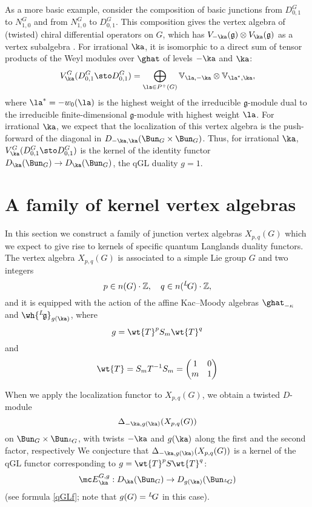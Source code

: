 \documentclass[11pt,reqno]{amsart}
\theoremstyle{plain}
\numberwithin{equation}{section}
\newcommand{\Z}{\mathbb{Z}}
\newcommand{\g}{\mathfrak{g}}
\def\neg{\negthinspace}
\def\lg{{}^L\neg\g}
\def\hlg{\wh{\lg}}
\def\LG{{}^L\neg G}
\theoremstyle{definition}
\begin{document}
As a more basic example, consider the composition of basic junctions
from $D^G_{0,1}$ to $N^G_{1,0}$ and from $N^G_{1,0}$ to
$D^G_{0,1}$. This composition gives the vertex algebra of (twisted)
chiral differential operators on $G$, which has $V_{-\ka}(\g) \otimes
V_{\ka}(\g)$ as a vertex subalgebra \cite{AG1}. For irrational $\ka$, it
is isomorphic to a direct sum of tensor products of the Weyl modules
over $\ghat$ of levels $-\ka$ and $\ka$:
$$
V^G_\ka(D^{G}_{0,1} \sto D^G_{0,1}) =
\bigoplus_{\la \in P^+(G)} {\mathbb V}_{\la,-\ka} \otimes {\mathbb
  V}_{\la^*,\ka},
$$
where $\la^*=-w_0(\la)$ is the highest weight of the irreducible
$\g$-module dual to the irreducible finite-dimensional $\g$-module
with highest weight $\la$. For irrational $\ka$, we expect that the
localization of this vertex algebra is the push-forward of the
diagonal in $D_{-\ka,\ka}(\Bun_G \times \Bun_G)$. Thus, for irrational
$\ka$, $V^G_\ka(D^{G}_{0,1} \sto D^G_{0,1})$ is the kernel of the
identity functor $D_\ka(\Bun_G) \to D_\ka(\Bun_G)$, the qGL duality
$g=1$.

\section{A family of kernel vertex algebras}    \label{fam ker}

In this section we construct a family of junction vertex algebras
$X_{p,q}(G)$ which we expect to give rise to kernels of specific
quantum Langlands duality functors. The vertex algebra $X_{p,q}(G)$ is
associated to a simple Lie group $G$ and two integers
$$
p \in n(G) \cdot \Z, \quad q \in n(\LG) \cdot \Z,
$$
and it is equipped with the action of the affine Kac--Moody algebras
$\ghat_{-\kappa}$ and $\hlg_{g(\ka)}$, where
$$
g = \wt{T}^{p} S_m \wt{T}^q
$$
and
$$
\wt{T} = S_m T^{-1} S_m = \begin{pmatrix}
1 & 0 \\
m & 1
\end{pmatrix}
$$

When we apply the localization functor to $X_{p,q}(G)$, we obtain a
twisted $D$-module
$$
\Delta_{-\ka,g(\ka)}(X_{p,q}(G))
$$
on $\Bun_G \times \Bun_{\LG}$, with twists $-\ka$ and $g(\ka)$ along
the first and the second factor, respectively
We conjecture that $\Delta_{-\ka,g(\ka)}(X_{p,q}(G))$ is a kernel of the
qGL functor corresponding to $g = \wt{T}^{p} S \wt{T}^q$:
$$
{\mc E}^{G,g}_\ka: D_\ka(\Bun_G) \to D_{g(\ka)}(\Bun_{\LG})
$$
(see formula \eqref{qGLf}; note that $g(G)=\LG$ in this case).
\end{document}
